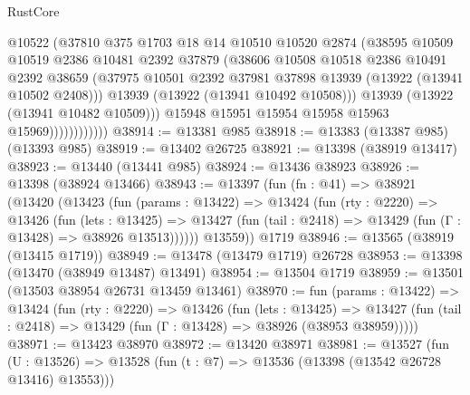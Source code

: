 \begin{lexlean}{RustCore}
\begin{coremodule}
                          @10522
                          (@37810
                            @375
                            @1703
                            @18
                            @14
                            @10510
                            @10520
                            @2874
                            (@38595
                              @10509
                              @10519
                              @2386
                              @10481
                              @2392
                              @37879
                              (@38606
                                @10508
                                @10518
                                @2386
                                @10491
                                @2392
                                @38659
                                (@37975
                                  @10501
                                  @2392
                                  @37981
                                  @37898
                                  @13939
                                  (@13922 (@13941 @10502 @2408)))
                                @13939
                                (@13922 (@13941 @10492 @10508)))
                              @13939
                              (@13922 (@13941 @10482 @10509)))
                            @15948
                            @15951
                            @15954
                            @15958
                            @15963
                            @15969))))))))))))
@38914 := @13381 @985
@38918 := @13383 (@13387 @985) (@13393 @985)
@38919 := @13402 @26725
@38921 := @13398 (@38919 @13417)
@38923 := @13440 (@13441 @985)
@38924 := @13436 @38923
@38926 := @13398 (@38924 @13466)
@38943 := @13397
    (fun (fn : @41) =>
    @38921
      (@13420
        (@13423
          (fun (params : @13422) =>
          @13424
            (fun (rty : @2220) =>
            @13426
              (fun (lets : @13425) =>
              @13427 (fun (tail : @2418) => @13429 (fun (Γ : @13428) => @38926 @13513))))))
        @13559))
    @1719
@38946 := @13565 (@38919 (@13415 @1719))
@38949 := @13478 (@13479 @1719) @26728
@38953 := @13398 (@13470 (@38949 @13487) @13491)
@38954 := @13504 @1719
@38959 := @13501 (@13503 @38954 @26731 @13459 @13461)
@38970 := fun (params : @13422) =>
  @13424
    (fun (rty : @2220) =>
    @13426
      (fun (lets : @13425) =>
      @13427 (fun (tail : @2418) => @13429 (fun (Γ : @13428) => @38926 (@38953 @38959)))))
@38971 := @13423 @38970
@38972 := @13420 @38971
@38981 := @13527
    (fun (U : @13526) => @13528 (fun (t : @7) => @13536 (@13398 (@13542 @26728 @13416) @13553)))

\end{coremodule}
\end{lexlean}

